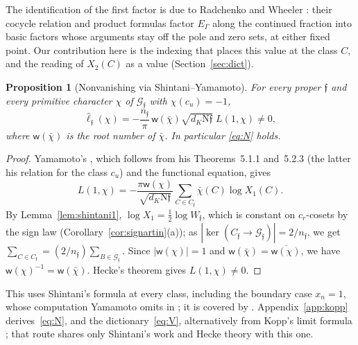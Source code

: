 \documentclass[11pt]{amsart}
\numberwithin{equation}{section}
\theoremstyle{plain}
\newtheorem{proposition}[theorem]{Proposition}
\theoremstyle{definition}
\theoremstyle{remark}
\begin{document}
The identification of the first factor is due to Radchenko and Wheeler \cite[Prop.~5]{RW}: their cocycle relation and product formulas \cite[(17), (19), (20)]{RW} factor \(E_\Gamma\) along the continued fraction into basic factors whose arguments stay off the pole and zero sets, at either fixed point. Our contribution here is the indexing that places this value at the class \(C\), and the reading of \(X_2(C)\) as a value (Section~\ref{sec:dict}).

\begin{proposition}[Nonvanishing via Shintani--Yamamoto]\label{prop:N}
For every proper \(\mathfrak f\) and every primitive character \(\chi\) of \(\mathcal G_{\mathfrak f}\) with \(\chi(c_u)=-1\),
\[\hat\ell_{\mathfrak f}(\chi)=-\frac{n_{\mathfrak f}}{\pi}\,\mathsf w(\bar\chi)\sqrt{d_K\mathrm N\mathfrak f}\;L(1,\chi)\neq0,\]
where \(\mathsf w(\bar\chi)\) is the root number of \(\bar\chi\). In particular \eqref{eq:N} holds.
\end{proposition}

\begin{proof}
Yamamoto's \cite[Cor.~5.2.5(1)]{Ya08}, which follows from his Theorems~5.1.1 and~5.2.3 (the latter his relation for the class \(c_u\)) and the functional equation, gives
\[L(1,\chi)=-\frac{\pi\mathsf w(\chi)}{\sqrt{d_K\mathrm N\mathfrak f}}\sum_{C\in C_{\mathfrak f}}\bar\chi(C)\log X_1(C).\]
By Lemma~\ref{lem:shintani1}, \(\log X_1=\tfrac12\log W_{\mathfrak f}\), which is constant on \(c_r\)-cosets by the sign law (Corollary~\ref{cor:signartin}(a)); as \(|\ker(C_{\mathfrak f}\to\mathcal G_{\mathfrak f})|=2/n_{\mathfrak f}\), we get \(\sum_{C\in C_{\mathfrak f}}=(2/n_{\mathfrak f})\sum_{B\in\mathcal G_{\mathfrak f}}\). Since \(|\mathsf w(\chi)|=1\) and \(\mathsf w(\bar\chi)=\overline{\mathsf w(\chi)}\), we have \(\mathsf w(\chi)^{-1}=\mathsf w(\bar\chi)\). Hecke's theorem gives \(L(1,\chi)\ne0\).
\end{proof}

This uses Shintani's formula at every class, including the boundary case \(x_n=1\), whose computation Yamamoto omits in \cite{Ya08}; it is covered by \cite[Thms.~3.5, 4.10]{Ya10}. Appendix~\ref{app:kopp} derives~\eqref{eq:N}, and the dictionary~\eqref{eq:V}, alternatively from Kopp's limit formula \cite[Thm.~1.1]{Ko}; that route shares only Shintani's work and Hecke theory with this one.
\end{document}
